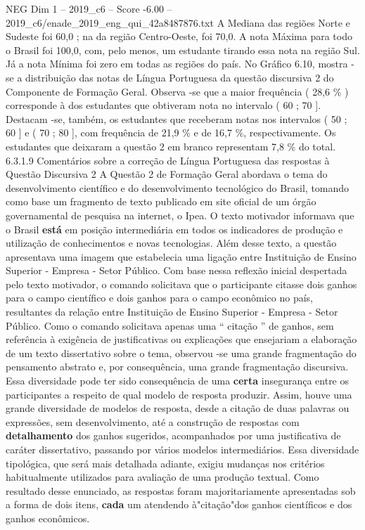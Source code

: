 \begin{textsample}{NEG Dim 1 – 2019\_c6 – Score -6.00 – 2019\_c6/enade\_2019\_eng\_qui\_42a8487876.txt}
A Mediana das regiões Norte e Sudeste foi 60,0 ; na da região Centro-Oeste, foi 70,0.
A nota Máxima para todo o Brasil foi 100,0, com, pelo menos, um estudante tirando essa nota na região Sul.
Já a nota Mínima foi zero em todas as regiões do país.
No Gráfico 6.10, mostra -se a distribuição das notas de Língua Portuguesa da questão discursiva 2 do Componente de Formação Geral.
Observa -se que a maior frequência ( 28,6 \% ) corresponde à dos estudantes que obtiveram nota no intervalo ( 60 ; 70 ].
Destacam -se, também, os estudantes que receberam notas nos intervalos ( 50 ; 60 ] e ( 70 ; 80 ], com frequência de 21,9 \% e de 16,7 \%, respectivamente.
Os estudantes que deixaram a questão 2 em branco representam 7,8 \% do total. 6.3.1.9 Comentários sobre a correção de Língua Portuguesa das respostas à Questão Discursiva 2 A Questão 2 de Formação Geral abordava o tema do desenvolvimento científico e do desenvolvimento tecnológico do Brasil, tomando como base um fragmento de texto publicado em site oficial de um órgão governamental de pesquisa na internet, o Ipea.
O texto motivador informava que o Brasil \textbf{está} em posição intermediária em todos os indicadores de produção e utilização de conhecimentos e novas tecnologias.
Além desse texto, a questão apresentava uma imagem que estabelecia uma ligação entre Instituição de Ensino Superior - Empresa - Setor Público.
Com base nessa reflexão inicial despertada pelo texto motivador, o comando solicitava que o participante citasse dois ganhos para o campo científico e dois ganhos para o campo econômico no país, resultantes da relação entre Instituição de Ensino Superior - Empresa - Setor Público.
Como o comando solicitava apenas uma “ citação ” de ganhos, sem referência à exigência de justificativas ou explicações que ensejariam a elaboração de um texto dissertativo sobre o tema, observou -se uma grande fragmentação do pensamento abstrato e, por consequência, uma grande fragmentação discursiva.
Essa diversidade pode ter sido consequência de uma \textbf{certa} insegurança entre os participantes a respeito de qual modelo de resposta produzir.
Assim, houve uma grande diversidade de modelos de resposta, desde a citação de duas palavras ou expressões, sem desenvolvimento, até a construção de respostas com \textbf{detalhamento} dos ganhos sugeridos, acompanhados por uma justificativa de caráter dissertativo, passando por vários modelos intermediários.
Essa diversidade tipológica, que será mais detalhada adiante, exigiu mudanças nos critérios habitualmente utilizados para avaliação de uma produção textual.
Como resultado desse enunciado, as respostas foram majoritariamente apresentadas sob a forma de dois itens, \textbf{cada} um atendendo à"citação"dos ganhos científicos e dos ganhos econômicos.

\end{textsample}
